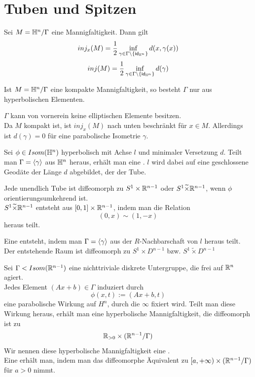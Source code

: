 \documentclass{book}
\begin{document}
\newpage
\section{Tuben und Spitzen}
\Prop{}
Sei $M = \mathbb{H}^n / \Gamma$ eine Mannigfaltigkeit. Dann gilt
\[ inj_x(M) = \frac{1}{2}\inf_{\gamma \in \Gamma\setminus\{\textsf{id}_{\mathbb{H}^n}\}} d(x, \gamma(x))  \]
\Kor{}
\[ inj(M) = \frac{1}{2}\inf_{\gamma \in \Gamma\setminus\{\textsf{id}_{\mathbb{H}^n}\}} d(\gamma) \]

\Kor{}
Ist $M = \mathbb{H}^n / \Gamma$ eine kompakte Mannigfaltigkeit, so besteht $\Gamma$ nur aus hyperbolischen Elementen.
\begin{Beweis}{}
	$\Gamma$ kann von vornerein keine elliptischen Elemente besitzen.\\
	Da $M$ kompakt ist, ist $inj_x(M)$ nach unten beschränkt für $x \in M$. Allerdings ist $d(\gamma) = 0$ für eine parabolische Isometrie $\gamma$.
\end{Beweis}

Sei $\phi \in Isom(\mathbb{H}^n)$ hyperbolisch mit Achse $l$ und minimaler Versetzung $d$. Teilt man $\Gamma = \left<\gamma\right>$ aus $\mathbb{H}^n$ heraus, erhält man eine . $l$ wird dabei auf eine geschlossene Geodäte der Länge $d$ abgebildet, der  der Tube.

\Prop{}
Jede unendlich Tube ist diffeomorph zu $S^1 \times \mathbb{R}^{n-1}$ oder $S^1 \widetilde{\times} \mathbb{R}^{n-1}$, wenn $\phi$ orientierungsumkehrend ist.\\
$S^1 \widetilde{\times} \mathbb{R}^{n-1}$ entsteht aus $[0,1] \times  \mathbb{R}^{n-1}$, indem man die Relation
\[ (0,x) \sim (1, -x) \]
heraus teilt.

\Def{}
Eine  entsteht, indem man $\Gamma = \left<\gamma\right>$ aus der $R$-Nachbarschaft von $l$ heraus teilt. Der entstehende Raum ist diffeomorph zu $S^1 \times D^{n-1}$ bzw. $S^1 \widetilde{\times} D^{n-1}$

Sei $\Gamma < Isom(\mathbb{R}^{n-1})$ eine nichttriviale diskrete Untergruppe, die frei auf $\mathbb{R}^n$ agiert.\\
Jedes Element $(Ax+b)\in\Gamma$ induziert durch
\[ \phi(x,t) := (Ax + b, t) \]
eine parabolische Wirkung auf $H^n$, durch die $\infty$ fixiert wird. Teilt man diese Wirkung heraus, erhält man eine hyperbolische Mannigfaltigkeit, die diffeomorph ist zu
\[ \mathbb{R}_{> 0} \times (\mathbb{R}^{n-1} / \Gamma) \]
Wir nennen diese hyperbolische Mannigfaltigkeit eine .\\
Eine  erhält man, indem man das diffeomorphe Äquivalent zu $[a,+\infty) \times (\mathbb{R}^{n-1} / \Gamma)$ für $a > 0$ nimmt.
\end{document}
